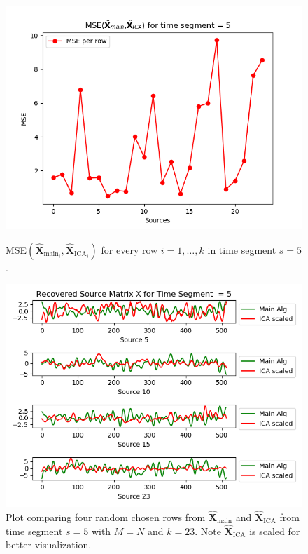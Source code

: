 \begin{figure}[H]
\begin{widepage}
    \begin{minipage}[t]{.45\textwidth}
\centering
\includegraphics[width=1\linewidth]{figures/ch_7/resultat/mse_none_removed_ica_timeseg5.png}
\caption{MSE$\left(\hat{\mathbf{X}}_{\text{main}_{i}},\hat{\mathbf{X}}_{\text{ICA}_{i}}\right)$ for every row $i = 1, \dots, k$ in time segment $s=5$.}
\label{fig:M=N_2}
\end{minipage} 
\hspace{0.5cm}
\begin{minipage}[t]{.45\textwidth}
\centering
\includegraphics[width=1\linewidth]{figures/ch_7/resultat/EEG_none_removed_scaled_timeseg5S1_CClean.png}
\caption{Plot comparing four random chosen rows from $\hat{\mathbf{X}}_{\text{main}}$ and $\hat{\mathbf{X}}_{\text{ICA}}$ from time segment $s = 5$ with $M = N$ and $k=23$. Note $\hat{\mathbf{X}}_{\text{ICA}}$ is scaled for better visualization.}
	\label{fig:M=N_3}
    \end{minipage}
\end{widepage}
\end{figure}
